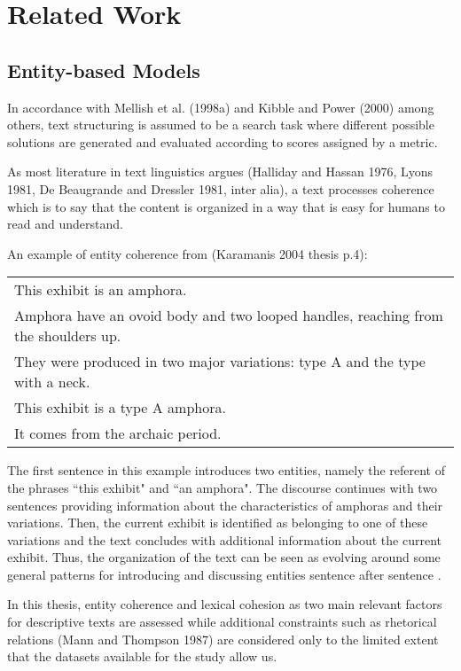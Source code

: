 \chapter{Related Work}
\label{chapt:related_work}

\section{Entity-based Models}
\label{sec:rel_work_entity_based_models}

In accordance with Mellish et al. (1998a) and Kibble and Power (2000) among others, text structuring is assumed to be a search task where different possible solutions are generated and evaluated according to scores assigned by a metric. 

As most literature in text linguistics argues (Halliday and Hassan 1976, Lyons 1981, De Beaugrande and Dressler 1981, inter alia), a text processes coherence which is to say that the content is organized in a way that is easy for humans to read and understand. 

An example of entity coherence from (Karamanis 2004 thesis p.4):

\begin{tabular}{l}
This exhibit is an amphora. \\
Amphora have an ovoid body and two looped handles, reaching from the shoulders up. \\
They were produced in two major variations: type A and the type with a neck.  \\
This exhibit is a type A amphora.  \\
It comes from the archaic period. 
\end{tabular}

The first sentence in this example introduces two entities, namely the referent of the phrases ``this exhibit" and ``an amphora". 
The discourse continues with two sentences providing information about the characteristics of amphoras and their  variations. 
Then, the current exhibit is identified as belonging to one of these variations and the text concludes with additional information about the current exhibit. 
Thus, the organization of the text can be seen as evolving around some general patterns for introducing and discussing entities sentence after sentence . 


In this thesis, entity coherence and lexical cohesion as two main relevant factors for descriptive texts are assessed while additional constraints such as rhetorical relations (Mann and Thompson 1987) are considered only to the limited extent that the datasets available for the study allow us. 

